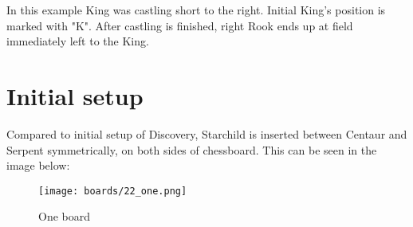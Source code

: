 In this example King was castling short to the right. Initial King's position is
marked with "K". After castling is finished, right Rook ends up at field immediately
left to the King.

\clearpage %

\section*{Initial setup}
\label{sec:One/Initial setup}

Compared to initial setup of Discovery, Starchild is inserted between Centaur and
Serpent symmetrically, on both sides of chessboard. This can be seen in the image
below:

\noindent
\begin{figure}[h]
\texttt{[image: boards/22\_one.png]}
\caption{One board}
\label{fig:22_one}
\end{figure}

\clearpage %
